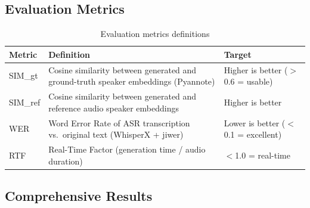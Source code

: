 \documentclass{ar-1col}
\begin{document}
\subsection{Evaluation Metrics}

\begin{table}[H]
\caption{Evaluation metrics definitions}
\label{tab:metrics}
\begin{center}
\begin{tabular}{@{}lp{7.5cm}p{3.8cm}@{}}
\toprule
\textbf{Metric} & \textbf{Definition} & \textbf{Target} \\
\midrule
SIM\_gt & Cosine similarity between generated and ground-truth speaker embeddings (Pyannote) & Higher is better ($>$0.6 = usable) \\
SIM\_ref & Cosine similarity between generated and reference audio speaker embeddings & Higher is better \\
WER & Word Error Rate of ASR transcription vs.\ original text (WhisperX + jiwer) & Lower is better ($<$0.1 = excellent) \\
RTF & Real-Time Factor (generation time / audio duration) & $<$1.0 = real-time \\
\bottomrule
\end{tabular}
\end{center}
\end{table}

\subsection{Comprehensive Results}
\end{document}
